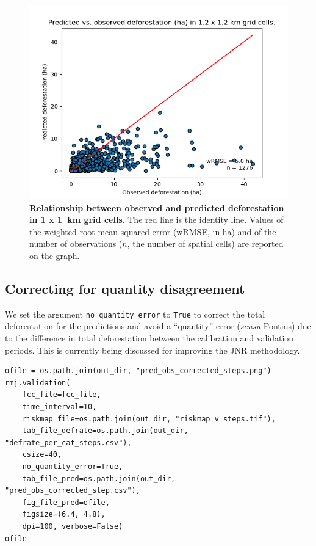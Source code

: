 \documentclass[paper=a4, 12pt, DIV=12]{scrartcl}
\begin{document}
\begin{figure}[H]
\centering
\includegraphics[width=0.8\linewidth]{outputs/pred_obs_steps.png}
\caption{\label{fig:org090da09}\textbf{Relationship between observed and predicted deforestation in 1 x 1 km grid cells}. The red line is the identity line. Values of the weighted root mean squared error (wRMSE, in ha) and of the number of observations (\(n\), the number of spatial cells) are reported on the graph.}
\end{figure}

\subsection{Correcting for quantity disagreement}
\label{sec:orgd9a32c1}

We set the argument \texttt{no\_quantity\_error} to \texttt{True} to correct the total deforestation for the predictions and avoid a ``quantity'' error (\emph{sensu} Pontius) due to the difference in total deforestation between the calibration and validation periods. This is currently being discussed for improving the JNR methodology.

\begin{verbatim}
ofile = os.path.join(out_dir, "pred_obs_corrected_steps.png")
rmj.validation(
    fcc_file=fcc_file,
    time_interval=10,
    riskmap_file=os.path.join(out_dir, "riskmap_v_steps.tif"),
    tab_file_defrate=os.path.join(out_dir, "defrate_per_cat_steps.csv"),
    csize=40,
    no_quantity_error=True,
    tab_file_pred=os.path.join(out_dir, "pred_obs_corrected_step.csv"),
    fig_file_pred=ofile,
    figsize=(6.4, 4.8),
    dpi=100, verbose=False)
ofile
\end{verbatim}
\end{document}

